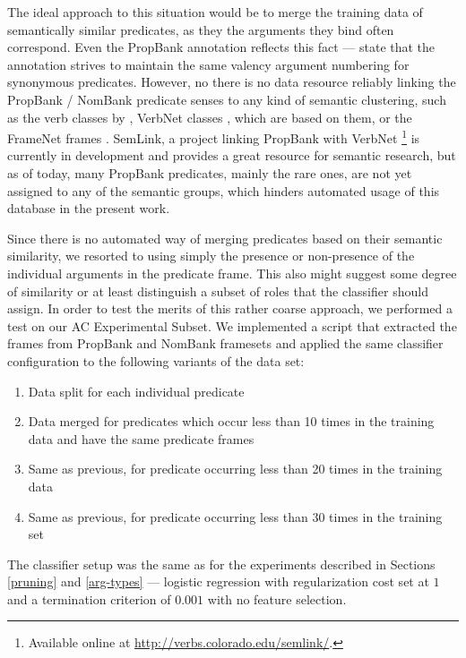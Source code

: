 \documentclass[12pt,notitlepage]{report}
\begin{document}
The ideal approach to this situation would be to merge the training data of semantically similar predicates, as they the arguments they bind often correspond. Even the PropBank annotation reflects this fact --- \citet{kingsbury02} state that the annotation strives to maintain the same valency argument numbering for synonymous predicates. However, no there is no data resource reliably linking the PropBank / NomBank predicate senses to any kind of semantic clustering, such as the verb classes by \citet{levin93}, VerbNet classes \citep{kipper-schuler05}, which are based on them, or the FrameNet frames \citep{baker98,baker02}. SemLink, a project linking PropBank with VerbNet \citep{loper07}\footnote{Available online at \url{http://verbs.colorado.edu/semlink/}.} is currently in development and provides a great resource for semantic research, but as of today, many PropBank predicates, mainly the rare ones, are not yet assigned to any of the semantic groups, which hinders automated usage of this database in the present work.

Since there is no automated way of merging predicates based on their semantic similarity, we resorted to using simply the presence or non-presence of the individual arguments in the predicate frame. This also might suggest some degree of similarity or at least distinguish a subset of roles that the classifier should assign. In order to test the merits of this rather coarse approach, we performed a test on our AC Experimental Subset. We implemented a script that extracted the frames from PropBank and NomBank framesets and applied the same classifier configuration to the following variants of the data set:
\begin{enumerate}
    \item Data split for each individual predicate
    \item Data merged for predicates which occur less than 10 times in the training data and have the same predicate frames
    \item Same as previous, for predicate occurring less than 20 times in the training data 
    \item Same as previous, for predicate occurring less than 30 times in the training set
\end{enumerate}
The classifier setup was the same as for the experiments described in Sections \ref{pruning} and \ref{arg-types} --- logistic regression with regularization cost set at $1$ and a termination criterion of $0.001$ with no feature selection.
\end{document}
